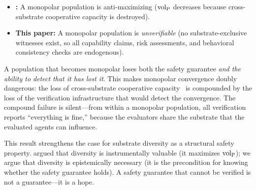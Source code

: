 \begin{itemize}
    \item \textbf{\citet{lasser2026horizon}:} A monopolar population is anti-maximizing
    (${\operatorname{vol}_{\mathrm{P}}}$ decreases because cross-substrate cooperative capacity is
    destroyed).
    \item \textbf{This paper:} A monopolar population is
    \emph{unverifiable} (no substrate-exclusive witnesses exist, so all
    capability claims, risk assessments, and behavioral consistency
    checks are endogenous).
\end{itemize}

A population that becomes monopolar loses both the safety guarantee
\emph{and the ability to detect that it has lost it}.  This makes
monopolar convergence doubly dangerous: the loss of cross-substrate
cooperative capacity~\citep{lasser2026horizon} is compounded by the loss of the
verification infrastructure that would detect the convergence.  The
compound failure is silent---from within a monopolar population, all
verification reports ``everything is fine,'' because the evaluators
share the substrate that the evaluated agents can influence.

This result strengthens the case for substrate diversity as a
structural safety property.  \citet{lasser2026horizon} argued that
diversity is instrumentally valuable (it maximizes ${\operatorname{vol}_{\mathrm{P}}}$); we argue
that
diversity is epistemically necessary (it is the precondition for knowing
whether the safety guarantee holds).  A safety guarantee that cannot be
verified is not a guarantee---it is a hope.
